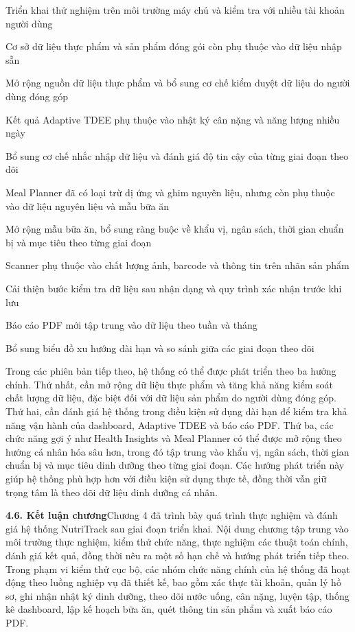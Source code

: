 Triển khai thử nghiệm trên môi trường máy chủ và kiểm tra với nhiều tài khoản người dùng

Cơ sở dữ liệu thực phẩm và sản phẩm đóng gói còn phụ thuộc vào dữ liệu nhập sẵn

Mở rộng nguồn dữ liệu thực phẩm và bổ sung cơ chế kiểm duyệt dữ liệu do người dùng đóng góp

Kết quả Adaptive TDEE phụ thuộc vào nhật ký cân nặng và năng lượng nhiều ngày

Bổ sung cơ chế nhắc nhập dữ liệu và đánh giá độ tin cậy của từng giai đoạn theo dõi

Meal Planner đã có loại trừ dị ứng và ghim nguyên liệu, nhưng còn phụ thuộc vào dữ liệu nguyên liệu và mẫu bữa ăn

Mở rộng mẫu bữa ăn, bổ sung ràng buộc về khẩu vị, ngân sách, thời gian chuẩn bị và mục tiêu theo từng giai đoạn

Scanner phụ thuộc vào chất lượng ảnh, barcode và thông tin trên nhãn sản phẩm

Cải thiện bước kiểm tra dữ liệu sau nhận dạng và quy trình xác nhận trước khi lưu

Báo cáo PDF mới tập trung vào dữ liệu theo tuần và tháng

Bổ sung biểu đồ xu hướng dài hạn và so sánh giữa các giai đoạn theo dõi

Trong các phiên bản tiếp theo, hệ thống có thể được phát triển theo ba hướng chính. Thứ nhất, cần mở rộng dữ liệu thực phẩm và tăng khả năng kiểm soát chất lượng dữ liệu, đặc biệt đối với dữ liệu sản phẩm do người dùng đóng góp. Thứ hai, cần đánh giá hệ thống trong điều kiện sử dụng dài hạn để kiểm tra khả năng vận hành của dashboard, Adaptive TDEE và báo cáo PDF. Thứ ba, các chức năng gợi ý như Health Insights và Meal Planner có thể được mở rộng theo hướng cá nhân hóa sâu hơn, trong đó tập trung vào khẩu vị, ngân sách, thời gian chuẩn bị và mục tiêu dinh dưỡng theo từng giai đoạn. Các hướng phát triển này giúp hệ thống phù hợp hơn với điều kiện sử dụng thực tế, đồng thời vẫn giữ trọng tâm là theo dõi dữ liệu dinh dưỡng cá nhân.

\textbf{4.6. Kết luận chương}Chương 4 đã trình bày quá trình thực nghiệm và đánh giá hệ thống NutriTrack sau giai đoạn triển khai. Nội dung chương tập trung vào môi trường thực nghiệm, kiểm thử chức năng, thực nghiệm các thuật toán chính, đánh giá kết quả, đồng thời nêu ra một số hạn chế và hướng phát triển tiếp theo. Trong phạm vi kiểm thử cục bộ, các nhóm chức năng chính của hệ thống đã hoạt động theo luồng nghiệp vụ đã thiết kế, bao gồm xác thực tài khoản, quản lý hồ sơ, ghi nhận nhật ký dinh dưỡng, theo dõi nước uống, cân nặng, luyện tập, thống kê dashboard, lập kế hoạch bữa ăn, quét thông tin sản phẩm và xuất báo cáo PDF.

